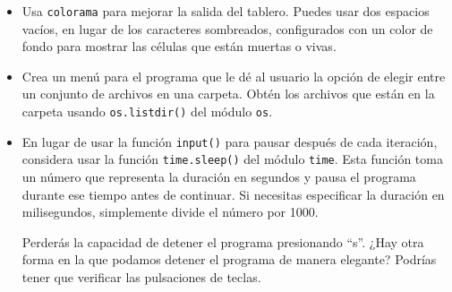 \documentclass[10pt,a4paper]{article}
\begin{document}
\begin{itemize}
\item Usa \texttt{colorama} para mejorar la salida del tablero. Puedes usar dos espacios vacíos, en lugar de los caracteres sombreados, configurados con un color de fondo para mostrar las células que están muertas o vivas.
\item Crea un menú para el programa que le dé al usuario la opción de elegir entre un conjunto de archivos en una carpeta. Obtén los archivos que están en la carpeta usando \lstinline|os.listdir()| del módulo \lstinline|os|.
\item En lugar de usar la función \lstinline|input()| para pausar después de cada iteración, considera usar la función \lstinline|time.sleep()| del módulo \lstinline|time|. Esta función toma un número que representa la duración en segundos y pausa el programa durante ese tiempo antes de continuar. Si necesitas especificar la duración en milisegundos, simplemente divide el número por 1000.

Perderás la capacidad de detener el programa presionando ``s''. ¿Hay otra forma en la que podamos detener el programa de manera elegante? Podrías tener que verificar las pulsaciones de teclas.
\end{itemize}
\end{document}
